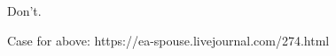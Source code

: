 \documentclass[40pt]{article}
\begin{document}
Don't.

Case for above: https://ea-spouse.livejournal.com/274.html
\end{document}
